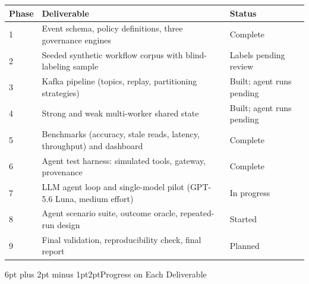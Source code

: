 \documentclass[11pt]{article}
\makeatletter
\renewcommand{\section}{\@startsection{section}{1}{0pt}%
  {6pt plus 2pt minus 1pt}{2pt}{\normalfont\large\bfseries}}
\makeatother
\begin{document}
\begin{tabularx}{\textwidth}{@{}l L l@{}}
\toprule
\textbf{Phase} & \textbf{Deliverable} & \textbf{Status} \\
 & Event schema, policy definitions, three governance engines & Complete \\
2 & Seeded synthetic workflow corpus with blind-labeling sample & Labels pending review \\
3 & Kafka pipeline (topics, replay, partitioning strategies) & Built; agent runs pending \\
4 & Strong and weak multi-worker shared state & Built; agent runs pending \\
5 & Benchmarks (accuracy, stale reads, latency, throughput) and dashboard & Complete \\
6 & Agent test harness: simulated tools, gateway, provenance & Complete \\
7 & LLM agent loop and single-model pilot (GPT-5.6 Luna, medium effort) & In progress \\
8 & Agent scenario suite, outcome oracle, repeated-run design & Started \\
9 & Final validation, reproducibility check, final report & Planned \\
\bottomrule
\end{tabularx}

\section{Progress on Each Deliverable}
\end{document}
